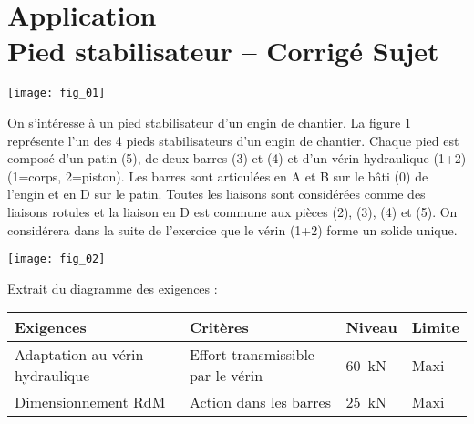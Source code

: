 \chapter*{Application  \\ 
Pied stabilisateur -- \ifprof Corrigé \else Sujet \fi}

\iflivret {} \else
\ifprof  {} \else \fi
\fi

\setcounter{question}{0}
\begin{marginfigure}
\texttt{[image: fig\_01]}
\end{marginfigure}

\ifprof
\else
On s’intéresse à un pied stabilisateur d’un engin de chantier.
La figure 1 représente l’un des 4 pieds stabilisateurs d’un engin de chantier. Chaque pied est composé d’un patin (5), de deux barres (3) et (4) et d’un vérin hydraulique (1+2) (1=corps, 2=piston). Les barres sont articulées en A et B sur le bâti (0) de l’engin et en D sur le patin. Toutes les liaisons sont considérées comme des liaisons rotules et la liaison en D est commune aux pièces (2), (3), (4) et (5). On considérera dans la suite de l’exercice que le vérin (1+2) forme un solide unique.

\begin{center}
\texttt{[image: fig\_02]}\hfill
\end{center}

Extrait du diagramme des exigences :
\begin{center}
\begin{tabular}{llll}
\hline
Exigences & Critères & Niveau & Limite \\
\hline
Adaptation au vérin hydraulique	& Effort transmissible par le vérin  & \SI{60}{kN} & Maxi \\
Dimensionnement RdM & Action dans les barres & \SI{25}{kN} & Maxi \\
\hline
\end{tabular}
\end{center}


